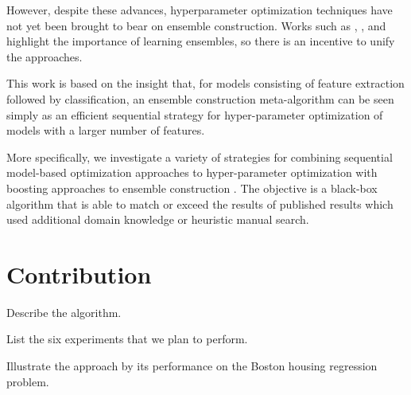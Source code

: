 \documentclass[11pt,twocolumn]{article}
\begin{document}
\vspace{11pt}
However, despite these advances, hyperparameter optimization techniques have not 
yet been brought to bear on ensemble construction.  Works such as \citet{gehler}, \citet{coates+lee+ng:2010},
and \citet{fg11} highlight the importance of learning ensembles, so there is an incentive
to unify the approaches.  

\vspace{11pt}
This work is based on the insight that, for models consisting of feature extraction followed by classification, 
an ensemble construction meta-algorithm can be seen simply as an
efficient sequential strategy for hyper-parameter optimization of 
models with a larger number of features.

\vspace{11pt}
More specifically, we investigate a variety of strategies for combining sequential model-based
optimization approaches to hyper-parameter optimization with boosting
approaches to ensemble construction \citep{mason,friedman}.  
The objective is a black-box algorithm that is able to match or exceed the
results of published results which used additional domain knowledge or
heuristic manual search.

\section{Contribution}

Describe the algorithm.

List the six experiments that we plan to perform.

Illustrate the approach by its performance on the Boston housing regression problem.
\end{document}
